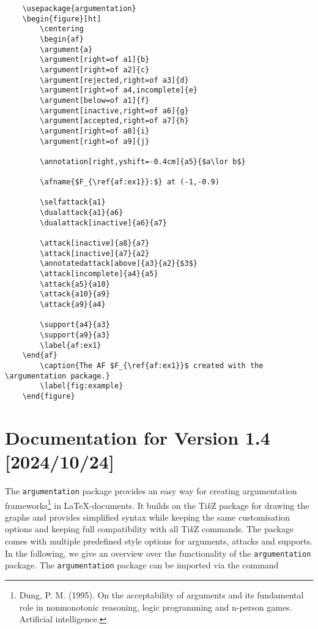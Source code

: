 \documentclass[headings=normal]{scrartcl}
\newcommand{\tikzname}{Ti\emph{k}Z\xspace}
\newcommand{\argumentation}{\texttt{argumentation}\xspace}
\begin{document}
\hspace{-1.2cm}
\begin{minipage}[c]{0.99\textwidth}
\begin{verbatim}
    \usepackage{argumentation}
    \begin{figure}[ht]
        \centering
        \begin{af}
        \argument{a}
        \argument[right=of a1]{b}
        \argument[right=of a2]{c}
        \argument[rejected,right=of a3]{d}
        \argument[right=of a4,incomplete]{e}
        \argument[below=of a1]{f}
        \argument[inactive,right=of a6]{g}
        \argument[accepted,right=of a7]{h}
        \argument[right=of a8]{i}
        \argument[right=of a9]{j}

        \annotation[right,yshift=-0.4cm]{a5}{$a\lor b$}

        \afname{$F_{\ref{af:ex1}}:$} at (-1,-0.9)

        \selfattack{a1}
        \dualattack{a1}{a6}
        \dualattack[inactive]{a6}{a7}
        
        \attack[inactive]{a8}{a7}
        \attack[inactive]{a7}{a2}
        \annotatedattack[above]{a3}{a2}{$3$}
        \attack[incomplete]{a4}{a5}
        \attack{a5}{a10}
        \attack{a10}{a9}
        \attack{a9}{a4}

        \support{a4}{a3}
        \support{a9}{a3}
        \label{af:ex1}
    \end{af}
        \caption{The AF $F_{\ref{af:ex1}}$ created with the \argumentation package.}
        \label{fig:example}
    \end{figure}
\end{verbatim}
\end{minipage}

\newpage\section{Documentation for Version 1.4 [2024/10/24]}\label{sec:documentation}

The \argumentation package provides an easy way for creating argumentation frameworks\footnote{Dung, P. M. (1995). On the acceptability of arguments and its fundamental role in nonmonotonic reasoning, logic programming and n-person games. Artificial intelligence.} in \LaTeX-documents.
It builds on the \tikzname package for drawing the graphs and provides simplified syntax while keeping the same customisation options and keeping full compatibility with all \tikzname commands.
The package comes with multiple predefined style options for arguments, attacks and supports.
In the following, we give an overview over the functionality of the \argumentation package.
The \argumentation package can be imported via the command
    
\end{document}
